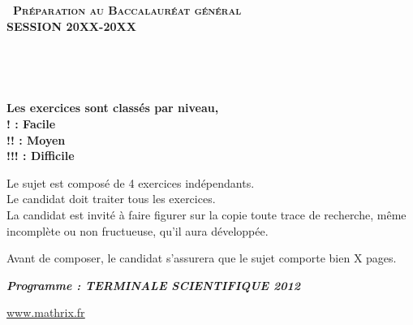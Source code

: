 \documentclass[12pt]{article}
\begin{document}
\setlength\parindent{0mm}

		\renewcommand \footrulewidth{.2pt}
		\pagestyle{fancy}
		\thispagestyle{empty} 

		\begin{center} 
		{\Large{\textbf{\textsc{\decofourleft~Préparation au Baccalauréat général ~\decofourright\\[5pt]
		\vspace{0.3cm}
		SESSION 20XX-20XX}}}}


		\vspace{1cm}

		\\

		\vspace{1.2cm}

		\\
		\vspace{0.4cm}

		\vspace{0.4cm}
		\textbf{Les exercices sont classés par niveau, \\ 
		! : Facile\\
		!! : Moyen\\
		!!! : Difficile }
		\vspace{1.5cm}

		Le sujet est composé de 4 exercices indépendants.\\
		Le candidat doit traiter tous les exercices.\\
		La candidat est invité à faire figurer sur la copie toute trace de recherche, même incomplète ou 			non fructueuse, qu'il aura développée.

		\vspace{1.5cm}

		Avant de composer, le candidat s'assurera que le sujet comporte bien X pages.

		\vspace{1cm}

		\textbf{\textit{Programme : TERMINALE SCIENTIFIQUE 2012}}
	
		\vspace{2cm}
		\href{http://www.mathrix.fr}{\Large\underline{www.mathrix.fr}}


\newpage
	\end{center}
\end{document}
